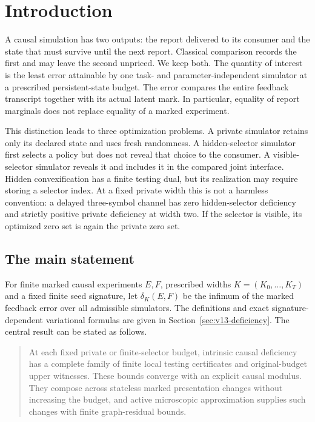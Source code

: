 \section{Introduction}\label{sec:v14-introduction}
A causal simulation has two outputs: the report delivered to its consumer
and the state that must survive until the next report. Classical comparison
records the first and may leave the second unpriced. We keep both. The
quantity of interest is the least error attainable by one task- and
parameter-independent simulator at a prescribed persistent-state budget.
The error compares the entire feedback transcript together with its actual
latent mark. In particular, equality of report marginals does not replace
equality of a marked experiment.

This distinction leads to three optimization problems. A private simulator
retains only its declared state and uses fresh randomness. A hidden-selector
simulator first selects a policy but does not reveal that choice to the
consumer. A visible-selector simulator reveals it and includes it in the
compared joint interface. Hidden convexification has a finite testing dual,
but its realization may require storing a selector index. At a fixed
private width this is not a harmless convention: a delayed three-symbol
channel has zero hidden-selector deficiency and strictly positive private
deficiency at width two. If the selector is visible, its optimized zero set
is again the private zero set.

\subsection{The main statement}
For finite marked causal experiments $E,F$, prescribed widths
$K=(K_0,\ldots,K_T)$ and a fixed finite seed signature, let
$\delta_K(E,F)$ be the infimum of the marked feedback error over all
admissible simulators. The definitions and exact signature-dependent
variational formulas are given in Section~\ref{sec:v13-deficiency}.
The central result can be stated as follows.

\begin{quote}
At each fixed private or finite-selector budget, intrinsic causal deficiency
has a complete family of finite local testing certificates and original-budget
upper witnesses. These bounds converge with an explicit causal modulus.
They compose across stateless marked presentation changes without increasing
the budget, and active microscopic approximation supplies such changes with
finite graph-residual bounds.
\end{quote}

